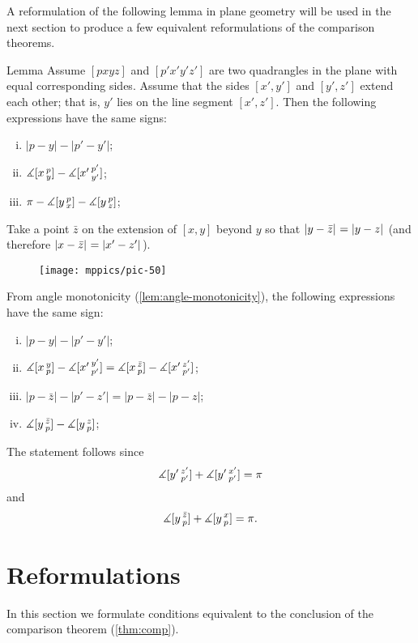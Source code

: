 A reformulation of the following lemma in plane geometry will be used in the next section to produce a few equivalent reformulations of the comparison theorems.

\begin{thm}{Lemma}
\label{lem:alex}
Assume $[pxyz]$ and $[p'x'y'z']$ are two quadrangles in the plane with equal corresponding sides.
Assume that the sides $[x',y']$ and $[y',z']$ extend each other; that is, $y'$ lies on the line segment $[x',z']$.
Then the following expressions have the same signs:
\begin{enumerate}[(i)]
 \item $|p-y|-|p'-y'|$;
 \item $\measuredangle[x\,{}^{p}_{y}]-\measuredangle[x'\,{}^{p'}_{y'}]$;
 \item $\pi-\measuredangle[y\,{}^{p}_{x}]-\measuredangle[y\,{}^{p}_{z}]$;
\end{enumerate}
\end{thm}

Take 
a point $\bar z$ on the extension of 
$[x,y]$ beyond $y$ so that $\dist{y}{\bar z}{}=\dist{y}{z}{}$ (and therefore $\dist{x}{\bar z}{}=\dist{x'}{z'}{}$). 
 
\begin{figure}[!ht]
\vskip-0mm
\centering
\texttt{[image: mppics/pic-50]}
\vskip-0mm
\end{figure}

From angle monotonicity (\ref{lem:angle-monotonicity}), 
the following expressions have the same sign:
\begin{enumerate}[(i)]
\item $|p-y|-|p'-y'|$;
\item $\measuredangle[x\,{}^{y}_{p}]-\measuredangle[x'\,{}^{y'}_{p'}]=\measuredangle[x\,{}^{\bar z}_{p}]-\measuredangle[x'\,{}^{z'}_{p'}]$;
\item $|p-\bar z|-|p'-z'| = | p - \bar z | - | p-z | $;
\item $\measuredangle[y\,{}^{\bar z}_{p}]-\measuredangle[y\,{}^{z}_{p}]$;
\end{enumerate}
The statement follows since
\[\measuredangle[y'\,{}^{z'}_{p'}]+\measuredangle[y'\,{}^{x'}_{p'}]=\pi\]
and
\[\measuredangle[y\,{}^{\bar z}_{p}]+\measuredangle[y\,{}^{x}_{p}]=\pi.\]
\qedsf

\section{Reformulations}

In this section we formulate conditions equivalent to the conclusion of the comparison theorem (\ref{thm:comp}).

